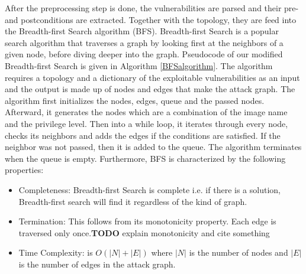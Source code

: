 After the preprocessing step is done, the vulnerabilities are parsed and their pre- and postconditions are extracted. Together with the topology, they are feed into the Breadth-first Search algorithm (BFS).
Breadth-first Search is a popular search algorithm that traverses a graph by looking first at the neighbors of a given node, before diving deeper into the graph. Pseudocode of our modified Breadth-first Search is given in Algorithm \ref{BFSalgorithm}. The algorithm requires a topology and a dictionary of the exploitable vulnerabilities as an input and the output is made up of nodes and edges that make the attack graph. The algorithm first initializes the nodes, edges, queue and the passed nodes. Afterward, it generates the nodes which are a combination of the image name and the privilege level. Then into a while loop, it iterates through every node, checks its neighbors and adds the edges if the conditions are satisfied. If the neighbor was not passed, then it is added to the queue. The algorithm terminates when the queue is empty. Furthermore, BFS is characterized by the following properties:

\begin{itemize}
	\item Completeness: Breadth-first Search is complete i.e. if there is a solution, Breadth-first search will find it regardless of the kind of graph.
	\item Termination: This follows from its monotonicity property. Each edge is traversed only once.\textbf{TODO} explain monotonicity and cite something\\
	\item Time Complexity: is $O(|N| + |E|)$ where $|N|$ is the number of nodes and $|E|$ is the number of edges in the attack graph.
\end{itemize}